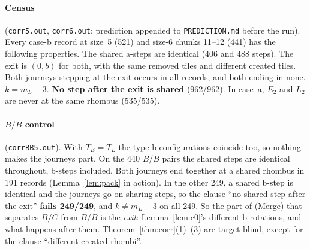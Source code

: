 \documentclass[11pt]{article}
\theoremstyle{definition}\newtheorem{definition}[theorem]{Definition}\newtheorem{remark}[theorem]{Remark}
\begin{document}
\paragraph{Census} (\texttt{corr5.out}, \texttt{corr6.out}; prediction appended to \texttt{PREDICTION.md} before the run). Every case-b record at size~5 (521) and size-6 chunks 11--12 (441) has the following properties. The shared a-steps are identical (406 and 488 steps). The exit is $(0,b)$ for both, with the same removed tiles and different created tiles. Both journeys stepping at the exit occurs in all records, and both ending in none. $k=m_L-3$. \textbf{No step after the exit is shared} (962/962). In case~a, $E_2$ and $L_2$ are never at the same rhombus (535/535).
\paragraph{$B/B$ control} (\texttt{corrBB5.out}). With $T_E=T_L$ the type-b configurations coincide too, so nothing makes the journeys part. On the 440 $B/B$ pairs the shared steps are identical throughout, b-steps included. Both journeys end together at a shared rhombus in 191 records (Lemma~\ref{lem:pack} in action). In the other 249, a shared b-step is identical and the journeys go on sharing steps, so the clause ``no shared step after the exit'' \textbf{fails 249/249}, and $k\neq m_L-3$ on all 249. So the part of (Merge) that separates $B/C$ from $B/B$ is the \emph{exit}: Lemma~\ref{lem:c0}'s different b-rotations, and what happens after them. Theorem~\ref{thm:corr}(1)--(3) are target-blind, except for the clause ``different created rhombi''.
\end{document}
